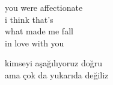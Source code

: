 \documentclass[10pt, openright, oneside]{memoir}
\theoremstyle{definition}
\begin{document}
%
\newpage
{}
\vspace*{\fill}
\settowidth{\versewidth}{you were affectionate}
\begin{cverse}
  you were affectionate \\
  i think that's \\
  what made me fall \\
  in love with you \\
\end{cverse}
\vspace*{\fill}
%
\newpage
{}
\vspace*{\fill}
\settowidth{\versewidth}{ama çok da yukarıda değiliz}
\begin{cverse}
  kimseyi aşağılıyoruz doğru \\
  ama çok da yukarıda değiliz \\
\end{cverse}
\vspace*{\fill}
%
\newpage
{}
\vspace*{\fill}
\settowidth{\versewidth}{geriye kaldı defterde belirsiz on bir sayfa}
\end{document}
